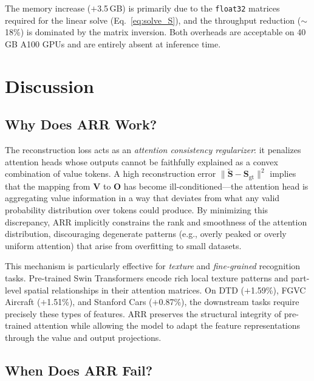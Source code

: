 \documentclass[review,12pt,authoryear]{elsarticle}
\newcommand{\method}{ARR}
\begin{document}
The memory increase ($+$3.5\,GB) is primarily due to the \texttt{float32} matrices required for the linear solve (Eq.~\eqref{eq:solve_S}), and the throughput reduction ($\sim$18\%) is dominated by the matrix inversion.
Both overheads are acceptable on 40\,GB A100 GPUs and are entirely absent at inference time.

\section{Discussion}
\label{sec:discussion}

\subsection{Why Does \method{} Work?}
\label{sec:disc:why}

The reconstruction loss acts as an \emph{attention consistency regularizer}: it penalizes attention heads whose outputs cannot be faithfully explained as a convex combination of value tokens.
A high reconstruction error $\|\tilde{\mathbf{S}} - \mathbf{S}_{\text{gt}}\|^2$ implies that the mapping from $\mathbf{V}$ to $\mathbf{O}$ has become ill-conditioned---the attention head is aggregating value information in a way that deviates from what any valid probability distribution over tokens could produce.
By minimizing this discrepancy, \method{} implicitly constrains the rank and smoothness of the attention distribution, discouraging degenerate patterns (e.g., overly peaked or overly uniform attention) that arise from overfitting to small datasets.

This mechanism is particularly effective for \emph{texture} and \emph{fine-grained} recognition tasks.
Pre-trained Swin Transformers encode rich local texture patterns and part-level spatial relationships in their attention matrices.
On DTD ($+$1.59\%), FGVC Aircraft ($+$1.51\%), and Stanford Cars ($+$0.87\%), the downstream tasks require precisely these types of features.
\method{} preserves the structural integrity of pre-trained attention while allowing the model to adapt the feature representations through the value and output projections.

\subsection{When Does \method{} Fail?}
\label{sec:disc:fail}
\end{document}
